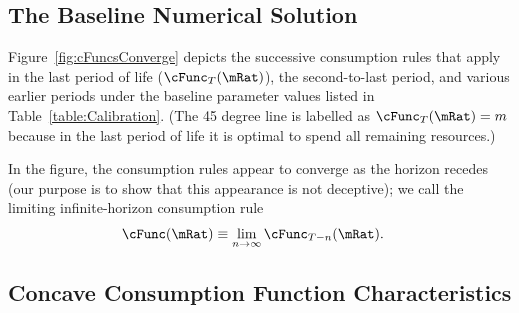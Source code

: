 \documentclass[./BufferStockTheory.tex]{subfiles}
\begin{document}
\hypertarget{Baseline-Numerical-Solution}{}
\subsection{The Baseline Numerical Solution}

Figure~\ref{fig:cFuncsConverge} depicts the successive consumption
rules that apply in the last period of life ($\cFunc_{T}(\mRat)$), the
second-to-last period, and various earlier periods under the
baseline parameter values listed in Table~\ref{table:Calibration}.
(The 45 degree line is labelled as $\cFunc_{T}(\mRat) = m$ because in
the last period of life it is optimal to spend all remaining
resources.)




\providecommand{\figName}{Convergence-of-the-Consumption-Rules} %
\providecommand{\figFile}{cFuncsConverge} %
\hypertarget{\figFile}{}
\hypertarget{\figName}{}

In the figure, the consumption rules appear to converge as the horizon
recedes (our purpose is to show that this appearance is not deceptive); we
call the limiting infinite-horizon consumption rule
\begin{equation}\begin{gathered}\begin{aligned}
\cFunc(\mRat)  & \equiv  \lim_{n \rightarrow \infty} \cFunc_{T-n}(\mRat).
\end{aligned}\end{gathered}\end{equation}

\hypertarget{Concave-Consumption-Function-Characteristics}{}
\subsection{Concave Consumption Function Characteristics}\label{sec:cExists}
\end{document}
